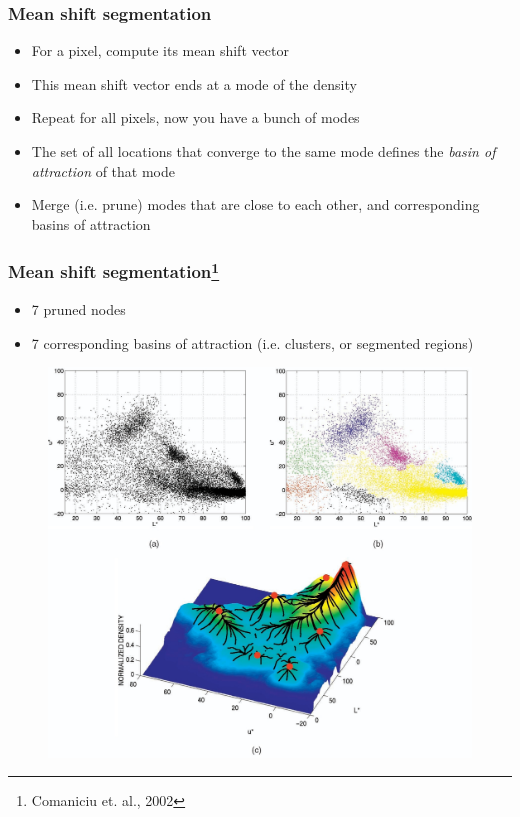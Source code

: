 \begin{frame}\frametitle{Mean shift segmentation}\logoCSIPCPL\mypagenum
	\begin{itemize}				
		\item For a pixel, compute its mean shift vector
		\item This mean shift vector ends at a mode of the density
		\item Repeat for all pixels, now you have a bunch of modes
		\item The set of all locations that converge to the same mode defines the  {\color{red}\emph {basin of attraction}} of that mode
		\item Merge (i.e. prune) modes that are close to each other, and corresponding basins of attraction
	\end{itemize}
\end{frame}




\begin{frame}
\frametitle{Mean shift segmentation\footnote{Comaniciu et. al., 2002}}
\logoCSIPCPL\mypagenum
	\begin{itemize}				
		\item 7 pruned nodes
		\item 7 corresponding basins of attraction (i.e. clusters, or segmented regions)
	\end{itemize}
	\begin{figure}
		\includegraphics[height=0.65\textheight]{figs/PRML_meanShift2.pdf}
	\end{figure}
\end{frame}




